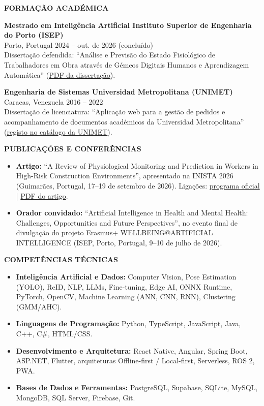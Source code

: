 \documentclass[10pt,a4paper]{article}
\newcommand{\cvsection}[1]{%
    \vspace{11pt}%
    {\large\bfseries\color{navy}#1}\par
    \vspace{2pt}{\color{accent}\rule{\linewidth}{1.2pt}}\par
    \vspace{5pt}%
}
\begin{document}
\cvsection{FORMAÇÃO ACADÉMICA}
\textbf{Mestrado em Inteligência Artificial \textbar{} Instituto Superior de Engenharia do Porto (ISEP)}\\
{\color{muted}Porto, Portugal \textbar{} 2024 -- out. de 2026 (concluído)}\\
Dissertação defendida: ``Análise e Previsão do Estado Fisiológico de Trabalhadores em Obra através de Gémeos Digitais Humanos e Aprendizagem Automática'' (\href{https://drive.google.com/file/d/1xlqiDRtNX2Xj5_9TnHy6inUlAnseSHbF/view?usp=drive\_link}{PDF da dissertação}).

\vspace{5pt}
\textbf{Engenharia de Sistemas \textbar{} Universidad Metropolitana (UNIMET)}\\
{\color{muted}Caracas, Venezuela \textbar{} 2016 -- 2022}\\
Dissertação de licenciatura: ``Aplicação web para a gestão de pedidos e acompanhamento de documentos académicos da Universidad Metropolitana'' (\href{https://unimet.ent.sirsi.net/client/es_ES/default/search/detailnonmodal/ent:\%24002f\%24002fSD\_ILS\%24002f0\%24002fSD\_ILS:132264/one}{registo no catálogo da UNIMET}).

\cvsection{PUBLICAÇÕES E CONFERÊNCIAS}
\begin{itemize}
    \item \textbf{Artigo:} ``A Review of Physiological Monitoring and Prediction in Workers in High-Risk Construction Environments'', apresentado na INISTA 2026 (Guimarães, Portugal, 17--19 de setembro de 2026). Ligações: \href{https://inista2026.di.uminho.pt/pdf/INISTA\_Official\_Program.pdf}{programa oficial} | \href{https://drive.google.com/file/d/1Kh2M0t4dUh3F5vFrKY5sZMfaRxV1H2PT/view?usp=sharing}{PDF do artigo}.
    \item \textbf{Orador convidado:} ``Artificial Intelligence in Health and Mental Health: Challenges, Opportunities and Future Perspectives'', no evento final de divulgação do projeto Erasmus+ WELLBEING@ARTIFICIAL INTELLIGENCE (ISEP, Porto, Portugal, 9--10 de julho de 2026).
\end{itemize}

\cvsection{COMPETÊNCIAS TÉCNICAS}
\begin{itemize}
    \item \textbf{Inteligência Artificial e Dados:} Computer Vision, Pose Estimation (YOLO), ReID, NLP, LLMs, Fine-tuning, Edge AI, ONNX Runtime, PyTorch, OpenCV, Machine Learning (ANN, CNN, RNN), Clustering (GMM/AHC).
    \item \textbf{Linguagens de Programação:} Python, TypeScript, JavaScript, Java, C++, C\#, HTML/CSS.
    \item \textbf{Desenvolvimento e Arquitetura:} React Native, Angular, Spring Boot, ASP.NET, Flutter, arquiteturas Offline-first / Local-first, Serverless, ROS 2, PWA.
    \item \textbf{Bases de Dados e Ferramentas:} PostgreSQL, Supabase, SQLite, MySQL, MongoDB, SQL Server, Firebase, Git.
\end{itemize}
\end{document}
